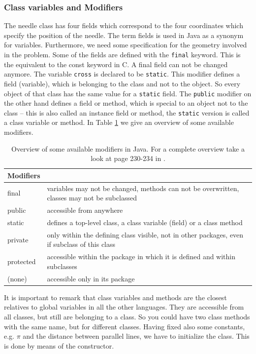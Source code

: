\subsubsection{Class variables and Modifiers}
The needle class has four fields which correspond to the four
coordinates which specify the position of the needle. 
The term fields is used in Java as a synonym for variables.
Furthermore, we
need some specification for the geometry involved in the problem.
Some of the fields  are
defined with the \verb|final| keyword. This is the equivalent to the
const keyword in C. A final field can not be changed anymore.
The variable \verb|cross| is declared to be \verb|static|.  This
modifier 
defines a field (variable), which is belonging
to the class and not to the object. So every object of that class 
has the same value for a \verb|static| field. The \verb|public| modifier
on the other hand defines a field or method, which is special to 
an object not to the class -- this is also called an instance field or
method, the \verb|static| version is called a class variable or
method.
In Table \ref{tab:modifiers} we give an overview of some available modifiers.
\begin{table}[htbp]
  \begin{center}
    \leavevmode
    \begin{tabular}{l|p{8cm}}
     Modifiers &                                 \\ \hline \hline
     final & variables may not be changed, methods can not be overwritten,
             classes may not be subclassed\\\hline
     public & accessible from anywhere\\ \hline
     static & defines a top-level class, a class variable (field) or 
                 a class method\\\hline
     private & only within the defining class visible, not in other 
               packages, even if subclass of this class\\\hline
     protected & accessible within the package in which it is defined and
                 within subclasses\\\hline
     (none) & accessible only in its package\\
    \end{tabular}
    \caption{Overview of some available modifiers in Java. For a complete
      overview take a look at page 230-234 in \cite{javanutshell}.}
    \label{tab:modifiers}
  \end{center}
\end{table}
It is important to remark that
class variables and methods are the closest relatives to global 
variables in all the other languages. They are accessible from all
classes, but still are belonging to a class. So you could have two
class methods with the same name, but for different classes.
Having fixed also some constants, e.g. $\pi$ and the distance between
parallel lines, we have to initialize the class. This is done by means
of the constructor.


